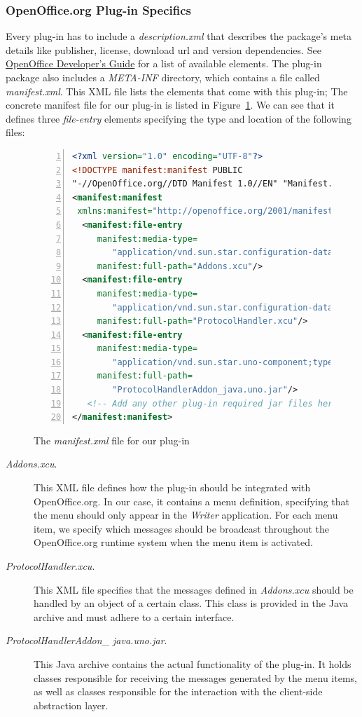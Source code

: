 \subsubsection{OpenOffice.org Plug-in Specifics}
Every plug-in has to include a \emph{description.xml} that describes the 
package's meta details like publisher, license, download url and version dependencies.
See \href{http://wiki.services.openoffice.org/wiki/Documentation/DevGuide/Extensions/Description_of_XML_Elements}{OpenOffice Developer's Guide}
for a list of available elements. The plug-in package also includes a
\emph{META-INF} directory, which contains a file called
\emph{manifest.xml}. This XML file lists the elements that come with
this plug-in;  The concrete manifest file for our plug-in is listed in
Figure~\ref{list:manifest}.  We can see that it defines three
\emph{file-entry} elements specifying the type and location of the
following files:
\begin{figure}[tb]
\centering
\begin{lstlisting}[language=XML,numbers=left,xleftmargin=8mm,columns=flexible]
<?xml version="1.0" encoding="UTF-8"?> 
<!DOCTYPE manifest:manifest PUBLIC 
"-//OpenOffice.org//DTD Manifest 1.0//EN" "Manifest.dtd"> 
<manifest:manifest 
 xmlns:manifest="http://openoffice.org/2001/manifest"> 
  <manifest:file-entry 
     manifest:media-type=
        "application/vnd.sun.star.configuration-data" 
     manifest:full-path="Addons.xcu"/> 
  <manifest:file-entry 
     manifest:media-type=
        "application/vnd.sun.star.configuration-data" 
     manifest:full-path="ProtocolHandler.xcu"/> 
  <manifest:file-entry 
     manifest:media-type=
        "application/vnd.sun.star.uno-component;type=Java" 
     manifest:full-path=
        "ProtocolHandlerAddon_java.uno.jar"/>
   <!-- Add any other plug-in required jar files here. -->
</manifest:manifest> 
\end{lstlisting}
\caption{The \emph{manifest.xml} file for our plug-in}
\label{list:manifest}
\end{figure}


\begin{description}
\item[\emph{Addons.xcu}.] This XML file defines how the plug-in should
  be integrated with OpenOffice.org. In our case, it contains a menu
  definition, specifying that the menu should only appear in the
  \emph{Writer} application. For each menu item, we specify which
  messages should be broadcast throughout the OpenOffice.org runtime
  system when the menu item is activated.
\item[\emph{ProtocolHandler.xcu}. ] This XML file specifies that the
  messages defined in \emph{Addons.xcu} should be handled by an object
  of a certain class. This class is provided in the Java archive and
  must adhere to a certain interface. 
\item[\emph{ProtocolHandlerAddon\_ java.uno.jar}.] This Java archive
  contains the actual functionality of the plug-in. It holds classes
  responsible for receiving the messages generated by the menu items,
  as well as classes responsible for the interaction with the
  client-side abstraction layer.
\end{description}


